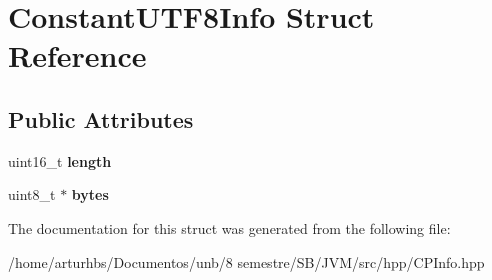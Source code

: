 \hypertarget{structConstantUTF8Info}{}\section{Constant\+U\+T\+F8\+Info Struct Reference}
\label{structConstantUTF8Info}
\subsection*{Public Attributes}
\begin{DoxyCompactItemize}
\item 
uint16\+\_\+t {\bfseries length}\hypertarget{structConstantUTF8Info_af60c124996f482092bdc4c47b2e5931a}{}\label{structConstantUTF8Info_af60c124996f482092bdc4c47b2e5931a}

\item 
uint8\+\_\+t $\ast$ {\bfseries bytes}\hypertarget{structConstantUTF8Info_a9bdfe2b8aaec7d227068de9b646769ac}{}\label{structConstantUTF8Info_a9bdfe2b8aaec7d227068de9b646769ac}

\end{DoxyCompactItemize}


The documentation for this struct was generated from the following file\+:\begin{DoxyCompactItemize}
\item 
/home/arturhbs/\+Documentos/unb/8 semestre/\+S\+B/\+J\+V\+M/src/hpp/C\+P\+Info.\+hpp\end{DoxyCompactItemize}
